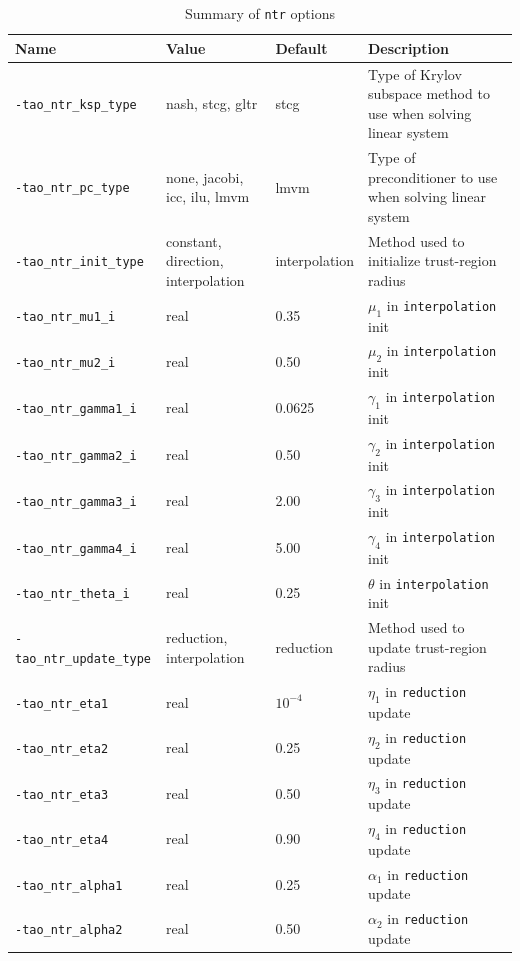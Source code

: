 \documentclass[]{book}
\begin{document}
\begin{table}[h]
\caption{Summary of {\tt ntr} options}
\label{table:ntroptions}
\vspace{5mm}
\begin{tabular}{l|p{1.5in}|l|p{2.0in}}
\hline
Name \rule{0pt}{2.6ex} & Value & Default & Description \\
\hline
{\tt -tao\_ntr\_ksp\_type} \rule{0pt}{2.6ex} & nash, stcg, gltr & stcg & Type of Krylov subspace method to use when solving linear system \\
{\tt -tao\_ntr\_pc\_type} & none, jacobi, icc, ilu, lmvm & lmvm & Type of preconditioner to use when solving linear system \\
{\tt -tao\_ntr\_init\_type} & constant, direction, interpolation &
interpolation & Method used to initialize trust-region radius \\
{\tt -tao\_ntr\_mu1\_i} & real & 0.35 & $\mu_1$ in {\tt interpolation} init \\
{\tt -tao\_ntr\_mu2\_i} & real & 0.50 & $\mu_2$ in {\tt interpolation} init \\
{\tt -tao\_ntr\_gamma1\_i} & real & 0.0625 & $\gamma_1$ in {\tt interpolation} init \\
{\tt -tao\_ntr\_gamma2\_i} & real & 0.50 & $\gamma_2$ in {\tt interpolation} init \\
{\tt -tao\_ntr\_gamma3\_i} & real & 2.00 & $\gamma_3$ in {\tt interpolation} init \\
{\tt -tao\_ntr\_gamma4\_i} & real & 5.00 & $\gamma_4$ in {\tt interpolation} init \\
{\tt -tao\_ntr\_theta\_i} & real & 0.25 & $\theta$ in {\tt interpolation} init \\
{\tt -tao\_ntr\_update\_type} & reduction, interpolation & reduction &
Method used to update trust-region radius \\
{\tt -tao\_ntr\_eta1} & real & $10^{-4}$ & $\eta_1$ in {\tt reduction} update \\
{\tt -tao\_ntr\_eta2} & real & 0.25 & $\eta_2$ in {\tt reduction} update \\
{\tt -tao\_ntr\_eta3} & real & 0.50 & $\eta_3$ in {\tt reduction} update \\
{\tt -tao\_ntr\_eta4} & real & 0.90 & $\eta_4$ in {\tt reduction} update \\
{\tt -tao\_ntr\_alpha1} & real & 0.25 & $\alpha_1$ in {\tt reduction} update \\
{\tt -tao\_ntr\_alpha2} & real & 0.50 & $\alpha_2$ in {\tt reduction} update \\

\end{tabular}
\end{table}
\end{document}
